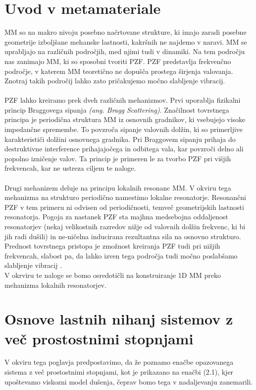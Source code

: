 \documentclass[12pt]{report}
\begin{document}
\section{Uvod v metamateriale}
\ac{MM} so na makro nivoju posebno načrtovane strukture, ki imajo zaradi posebne geometrije izboljšane
mehanske lastnosti, kakršnih ne najdemo v naravi. \ac{MM} se uprabljajo na različnih področjih,
med njimi tudi v dinamiki. Na tem področju nas zanimajo \ac{MM}, ki so sposobni tvoriti \ac{PZF}. \ac{PZF} 
predstavlja frekvenčno področje, v katerem \ac{MM} teoretično ne dopušča prostega širjenja valovanja.
Znotraj takih področij lahko zato pričakujemo močno slabljenje vibracij.
\\
\\
\ac{PZF} lahko kreiramo prek dveh različnih mehanizmov. Prvi uporablja fizikalni princip Braggovega sipanja
 \emph{(ang. Bragg Scattering)}. Značilnost tovrstnega principa je periodična struktura \ac{MM} iz osnovnih gradnikov,
 ki vsebujejo visoke impedančne spremembe. To povzroča sipanje valovnih dolžin, ki so primerljive karakterističi dolžini 
 osnovnega gradnika. Pri Braggovem sipanju prihaja do destruktivne interference prihajajočega in odbitega vala, kar povzroči
 delno ali popolno izničenje valov. Ta princip je primeren le za tvorbo \ac{PZF} pri višjih frekvencah, kar ne ustreza
 ciljem te naloge.
 \\
 \\
 Drugi mehanizem deluje na principu lokalnih resonanc \ac{MM}. V okviru tega mehanizma na strukturo periodično namestimo
 lokalne resonatorje. Resonančni \ac{PZF} v tem primeru ni odvisen od periodičnosti, temveč geometrijskih lastnosti resonatorja. 
 Pogoja za nastanek \ac{PZF} sta majhna medsebojna oddaljenost resonatorjev (nekaj velikostnih razredov nižje od valovnih dolžin frekvenc,
 ki bi jih radi dušili) in ne-ničelna inducirana rezultantna sila na osnovno strukturo. Prednost tovrstnega pristopa je zmožnost kreiranja
 \ac{PZF} tudi pri nižjih frekvencah, slabost pa, da lahko izven tega področja tudi močno poslabšamo slabljenje vibracij \cite{kosir}.
 \\
V okrviru te naloge se bomo osredotičli na konstruiranje 1D \ac{MM} preko mehanizma lokalnih resonatorjev.

\section{Osnove lastnih nihanj sistemov z več prostostnimi stopnjami}
V okviru tega poglavja predpostavimo, da že poznamo enačbe opazovanega sistema z več prostostnimi stopnjami, kot je 
prikazano na enačbi (2.1), kjer upoštevamo viskozni model dušenja, čeprav bomo tega v nadaljevanju zanemarili.
\end{document}
